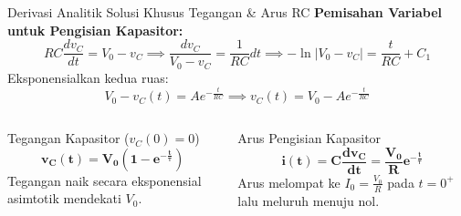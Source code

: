 \documentclass[aspectratio=169,10pt]{beamer}
\begin{document}
\begin{frame}{Derivasi Analitik Solusi Khusus Tegangan \& Arus RC}
  \textbf{Pemisahan Variabel untuk Pengisian Kapasitor:}
  \begin{equation*}
    R C \frac{dv_C}{dt} = V_0 - v_C \implies \frac{dv_C}{V_0 - v_C} = \frac{1}{R C} dt \implies -\ln|V_0 - v_C| = \frac{t}{RC} + C_1
  \end{equation*}
  Eksponensialkan kedua ruas:
  \begin{equation*}
    V_0 - v_C(t) = A e^{-\frac{t}{RC}} \implies v_C(t) = V_0 - A e^{-\frac{t}{RC}}
  \end{equation*}
  \begin{columns}[t]
    \begin{block}{Tegangan Kapasitor ($v_C(0) = 0$)}
      \begin{equation*}
        \mathbf{v_C(t) = V_0 \left(1 - e^{-\frac{t}{\tau}}\right)}
      \end{equation*}
      Tegangan naik secara eksponensial asimtotik mendekati $V_0$.
    \end{block}

    \begin{exampleblock}{Arus Pengisian Kapasitor}
      \begin{equation*}
        \mathbf{i(t) = C \frac{dv_C}{dt} = \frac{V_0}{R} e^{-\frac{t}{\tau}}}
      \end{equation*}
      Arus melompat ke $I_0 = \frac{V_0}{R}$ pada $t=0^+$ lalu meluruh menuju nol.
    \end{exampleblock}
  \end{columns}
\end{frame}
\end{document}
